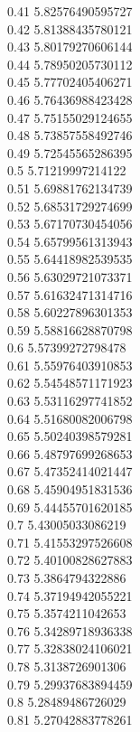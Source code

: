{0.41	5.82576490595727\\
0.42	5.81388435780121\\
0.43	5.80179270606144\\
0.44	5.78950205730112\\
0.45	5.77702405406271\\
0.46	5.76436988423428\\
0.47	5.75155029124655\\
0.48	5.73857558492746\\
0.49	5.72545565286395\\
0.5	5.71219997214122\\
0.51	5.69881762134739\\
0.52	5.68531729274699\\
0.53	5.67170730454056\\
0.54	5.65799561313943\\
0.55	5.64418982539535\\
0.56	5.63029721073371\\
0.57	5.61632471314716\\
0.58	5.60227896301353\\
0.59	5.58816628870798\\
0.6	5.57399272798478\\
0.61	5.55976403910853\\
0.62	5.54548571171923\\
0.63	5.53116297741852\\
0.64	5.51680082006798\\
0.65	5.50240398579281\\
0.66	5.48797699268653\\
0.67	5.47352414021447\\
0.68	5.45904951831536\\
0.69	5.44455701620185\\
0.7	5.43005033086219\\
0.71	5.41553297526608\\
0.72	5.40100828627883\\
0.73	5.3864794322886\\
0.74	5.37194942055221\\
0.75	5.3574211042653\\
0.76	5.34289718936338\\
0.77	5.32838024106021\\
0.78	5.3138726901306\\
0.79	5.29937683894459\\
0.8	5.28489486726029\\
0.81	5.27042883778261\\
}
